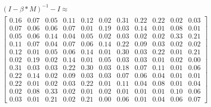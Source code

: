 \begin{gather}
	\nonumber (I - \beta * M)^{-1} - I \approx\\
	 \begin{bmatrix}
		0.16 & 0.07 & 0.05 & 0.11 & 0.12 & 0.02 & 0.31 & 0.22 & 0.22 & 0.02 & 0.03\\
		0.07 & 0.06 & 0.06 & 0.07 & 0.01 & 0.19 & 0.03 & 0.14 & 0.01 & 0.08 & 0.01\\
		0.05 & 0.06 & 0.14 & 0.04 & 0.05 & 0.02 & 0.03 & 0.02 & 0.02 & 0.33 & 0.21\\
		0.11 & 0.07 & 0.04 & 0.07 & 0.06 & 0.14 & 0.22 & 0.09 & 0.03 & 0.02 & 0.02\\
		0.12 & 0.01 & 0.05 & 0.06 & 0.14 & 0.01 & 0.30 & 0.03 & 0.22 & 0.01 & 0.21\\
		0.02 & 0.19 & 0.02 & 0.14 & 0.01 & 0.05 & 0.03 & 0.03 & 0.01 & 0.02 & 0.00\\
		0.31 & 0.03 & 0.03 & 0.22 & 0.30 & 0.03 & 0.18 & 0.07 & 0.11 & 0.01 & 0.06\\
		0.22 & 0.14 & 0.02 & 0.09 & 0.03 & 0.03 & 0.07 & 0.06 & 0.04 & 0.01 & 0.01\\
		0.22 & 0.01 & 0.02 & 0.03 & 0.22 & 0.01 & 0.11 & 0.04 & 0.08 & 0.01 & 0.04\\
		0.02 & 0.08 & 0.33 & 0.02 & 0.01 & 0.02 & 0.01 & 0.01 & 0.01 & 0.10 & 0.06\\
		0.03 & 0.01 & 0.21 & 0.02 & 0.21 & 0.00 & 0.06 & 0.01 & 0.04 & 0.06 & 0.07
	\end{bmatrix}
	\label{frml:katzZentralitaetPseudoMitarbeiter:formel5}
\end{gather}